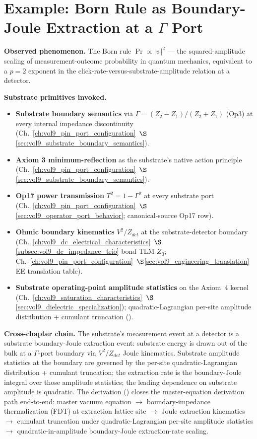 \section{Example: Born Rule as Boundary-Joule Extraction at a $\Gamma$ Port}
\label{sec:vol9_app_born_rule_gamma_extraction}

\textbf{Observed phenomenon.} The Born rule $\Pr \propto |\psi|^2$ --- the squared-amplitude scaling of measurement-outcome probability in quantum mechanics, equivalent to a $p = 2$ exponent in the click-rate-versus-substrate-amplitude relation at a detector.

\textbf{Substrate primitives invoked.}

\begin{itemize}
    \item \textbf{Substrate boundary semantics} via $\Gamma = (Z_2 - Z_1)/(Z_2 + Z_1)$ (Op3) at every internal impedance discontinuity (Ch.~\ref{ch:vol9_pin_port_configuration}~$\S$\ref{sec:vol9_substrate_boundary_semantics}).
    \item \textbf{Axiom 3 minimum-reflection} as the substrate's native action principle (Ch.~\ref{ch:vol9_pin_port_configuration}~$\S$\ref{sec:vol9_substrate_boundary_semantics}).
    \item \textbf{Op17 power transmission} $T^2 = 1 - \Gamma^2$ at every substrate port (Ch.~\ref{ch:vol9_pin_port_configuration}~$\S$\ref{sec:vol9_operator_port_behavior}; canonical-source  Op17 row).
    \item \textbf{Ohmic boundary kinematics} $V^2/Z_{det}$ at the substrate-detector boundary (Ch.~\ref{ch:vol9_dc_electrical_characteristics}~$\S$\ref{subsec:vol9_dc_impedance_trio} bond TLM $Z_0$; Ch.~\ref{ch:vol9_pin_port_configuration}~$\S$\ref{sec:vol9_engineering_translation} EE translation table).
    \item \textbf{Substrate operating-point amplitude statistics} on the Axiom~4 kernel (Ch.~\ref{ch:vol9_saturation_characteristics}~$\S$\ref{sec:vol9_dielectric_specialization}); quadratic-Lagrangian per-site amplitude distribution + cumulant truncation ().
\end{itemize}

\textbf{Cross-chapter chain.} The substrate's measurement event at a detector is a substrate boundary-Joule extraction event: substrate energy is drawn out of the bulk at a $\Gamma$-port boundary via $V^2/Z_{det}$ Joule kinematics. Substrate amplitude statistics at the boundary are governed by the per-site quadratic-Lagrangian distribution + cumulant truncation; the extraction rate is the boundary-Joule integral over those amplitude statistics; the leading dependence on substrate amplitude is quadratic. The derivation () closes the master-equation derivation path end-to-end: master vacuum equation $\to$ boundary-impedance thermalization (FDT) at extraction lattice site $\to$ Joule extraction kinematics $\to$ cumulant truncation under quadratic-Lagrangian per-site amplitude statistics $\to$ quadratic-in-amplitude boundary-Joule extraction-rate scaling.

